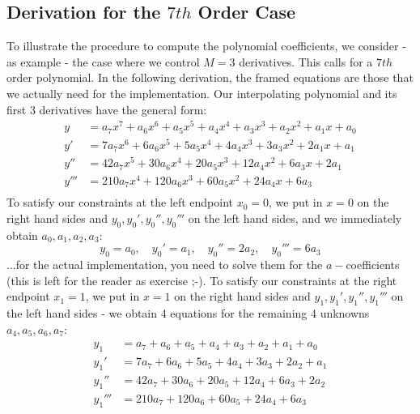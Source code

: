 \subsection{Derivation for the $7th$ Order Case}
To illustrate the procedure to compute the polynomial coefficients, we consider - as example - the case where we control $M = 3$ derivatives. This calls for a $7th$ order polynomial. In the following derivation, the framed equations are those that we actually need for the implementation. Our interpolating polynomial and its first 3 derivatives have the general form:
\begin{equation}
\begin{aligned}
 y    &=     a_7 x^7 +     a_6 x^6 +    a_5 x^5 +    a_4 x^4 +   a_3 x^3 +   a_2 x^2 + a_1 x + a_0 \\
 y'   &=   7 a_7 x^6 +   6 a_6 x^5 +  5 a_5 x^4 +  4 a_4 x^3 + 3 a_3 x^2 + 2 a_1 x   + a_1         \\
 y''  &=  42 a_7 x^5 +  30 a_6 x^4 + 20 a_5 x^3 + 12 a_4 x^2 + 6 a_3 x   + 2 a_1                   \\ 
 y''' &= 210 a_7 x^4 + 120 a_6 x^3 + 60 a_5 x^2 + 24 a_4 x   + 6 a_3                               \\  
\end{aligned} 
\end{equation}
To satisfy our constraints at the left endpoint $x_0 = 0$, we put in $x = 0$ on the right hand sides and $y_0, y_0', y_0'', y_0'''$ on the left hand sides, and we immediately obtain $a_0, a_1, a_2, a_3$:
\begin{equation}
\boxed
{
 y_0 = a_0, \quad y_0' = a_1, \quad y_0'' = 2 a_2, \quad y_0''' = 6 a_3
}
\end{equation}
...for the actual implementation, you need to solve them for the $a-$coefficients (this is left for the reader as exercise ;-). To satisfy our constraints at the right endpoint $x_1 = 1$, we put in $x = 1$ on the right hand sides and $y_1, y_1', y_1'', y_1'''$ on the left hand sides - we obtain 4 equations for the remaining 4 unknowns  $a_4, a_5, a_6, a_7$:
\begin{equation}
\begin{aligned}
 y_1    &=     a_7 +     a_6 +    a_5 +    a_4 +   a_3 +   a_2 + a_1 + a_0 \\
 y_1'   &=   7 a_7 +   6 a_6 +  5 a_5 +  4 a_4 + 3 a_3 + 2 a_2 + a_1       \\
 y_1''  &=  42 a_7 +  30 a_6 + 20 a_5 + 12 a_4 + 6 a_3 + 2 a_2             \\ 
 y_1''' &= 210 a_7 + 120 a_6 + 60 a_5 + 24 a_4 + 6 a_3                     \\  
\end{aligned} 
\end{equation}
